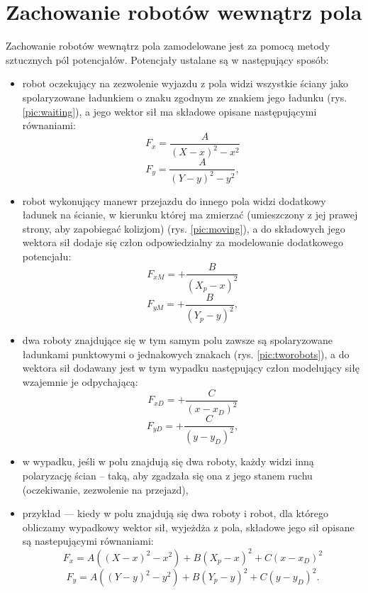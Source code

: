 \section{Zachowanie robotów wewnątrz pola}
	Zachowanie robotów wewnątrz pola zamodelowane jest za pomocą metody sztucznych pól potencjałów. Potencjały ustalane są w następujący sposób:
	\begin{itemize}
		\item robot oczekujący na zezwolenie wyjazdu z pola widzi wszystkie ściany jako spolaryzowane ładunkiem o znaku zgodnym ze znakiem jego ładunku (rys. \ref{pic:waiting}), a jego wektor sił ma składowe opisane następującymi równaniami:
                  $$F_x= \frac{A}{(X-x)^2 - x^2}$$
                  $$F_y= \frac{A}{(Y-y)^2 - y^2},$$
		\item robot wykonujący manewr przejazdu do innego pola widzi dodatkowy ładunek na ścianie, w kierunku której ma zmierzać (umieszczony z jej prawej strony, aby zapobiegać kolizjom) (rys. \ref{pic:moving}), a do składowych jego wektora sił dodaje się człon odpowiedzialny za modelowanie dodatkowego potencjału:
                  $$F_{xM}= +\frac{B}{(X_p-x)^2}$$
                  $$F_{yM}= +\frac{B}{(Y_p-y)^2},$$
		\item dwa roboty znajdujące się w tym samym polu zawsze są spolaryzowane ładunkami punktowymi o jednakowych znakach (rys. \ref{pic:tworobots}), a do wektora sił dodawany jest w tym wypadku następujący człon modelujący siłę wzajemnie je odpychającą:
                  $$F_{xD}= +\frac{C}{(x-x_D)^2}$$
                  $$F_{yD}= +\frac{C}{(y-y_D)^2},$$ 
		\item w wypadku, jeśli w polu znajdują się dwa roboty, każdy widzi inną polaryzację ścian -- taką, aby zgadzała się ona z jego stanem ruchu (oczekiwanie, zezwolenie na przejazd),
                \item przykład --- kiedy w polu znajdują się dwa roboty i robot, dla którego obliczamy wypadkowy wektor sił, wyjeżdża z pola, składowe jego sił opisane są nastepującymi równaniami:
                  $$F_x= A((X-x)^2 - x^2)+B(X_p-x)^2+C(x-x_D)^2$$
                  $$F_y= A((Y-y)^2 - y^2)+B(Y_p-y)^2+C(y-y_D)^2.$$ 
	\end{itemize}
	
